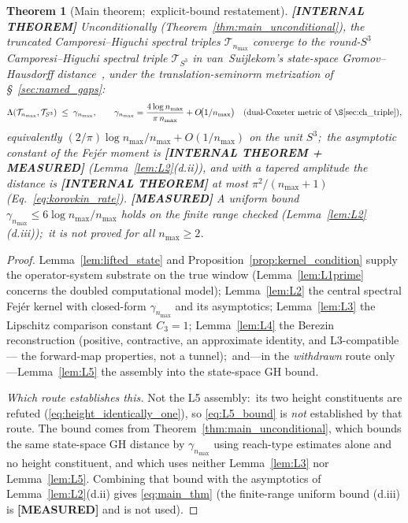 \documentclass[11pt,a4paper]{article}
\theoremstyle{plain}
\newtheorem{theorem}{Theorem}[section]
\theoremstyle{definition}
\newcommand{\nmax}{n_{\max}}
\newcommand{\sthree}{S^{3}}
\newcommand{\Tcal}{\mathcal{T}}
\begin{document}
\begin{theorem}[Main theorem;\ explicit-bound restatement]
\label{thm:main}
\textbf{[INTERNAL THEOREM]}
Unconditionally (Theorem~\ref{thm:main_unconditional}), the
truncated Camporesi--Higuchi spectral triples $\Tcal_{\nmax}$
converge to the round-$\sthree$ Camporesi--Higuchi spectral triple
$\Tcal_{\sthree}$ in van~Suijlekom's state-space Gromov--Hausdorff
distance~\cite{vs2021_jgp}, under the translation-seminorm
metrization of \S~\ref{sec:named_gaps}:
\begin{equation}\label{eq:main_thm}
   \Lambda(\Tcal_{\nmax}, \Tcal_{\sthree})
   \;\le\; \gamma_{\nmax}, \qquad
   \gamma_{\nmax} = \frac{4 \log \nmax}{\pi\,\nmax}
   + O\!\bigl(1/\nmax\bigr)
   \quad\text{(dual-Coxeter metric of \S\ref{sec:ch_triple})},
\end{equation}
equivalently $(2/\pi)\log\nmax/\nmax + O(1/\nmax)$ on the unit
$\sthree$;\ the asymptotic constant of the Fej\'er moment is
\textbf{[INTERNAL THEOREM + MEASURED]} (Lemma~\ref{lem:L2}(d.ii)), and
with a tapered amplitude the distance is \textbf{[INTERNAL THEOREM]}
at most $\pi^2/(\nmax+1)$ (Eq.~\eqref{eq:korovkin_rate}). \textbf{[MEASURED]} A uniform bound
$\gamma_{\nmax} \le 6 \log \nmax / \nmax$
holds on the finite range checked (Lemma~\ref{lem:L2}(d.iii));\ it is not
proved for all $\nmax \ge 2$.
\end{theorem}

\begin{proof}
Lemma~\ref{lem:lifted_state} and Proposition~\ref{prop:kernel_condition}
supply the operator-system substrate on the true window
(Lemma~\ref{lem:L1prime} concerns the doubled computational model);
Lemma~\ref{lem:L2} the central spectral Fej\'er kernel with closed-form
$\gamma_{\nmax}$ and its asymptotics; Lemma~\ref{lem:L3} the Lipschitz
comparison constant $C_3 = 1$; Lemma~\ref{lem:L4} the Berezin
reconstruction (positive, contractive, an approximate identity, and
L3-compatible --- the forward-map properties, not a tunnel);\ and---in the \emph{withdrawn} route only---Lemma~\ref{lem:L5} the assembly into the
state-space GH bound.

\emph{Which route establishes this.}  Not the L5 assembly:\ its two height
constituents are refuted (\eqref{eq:height_identically_one}), so
\eqref{eq:L5_bound} is \emph{not} established by that route.  The bound comes from
Theorem~\ref{thm:main_unconditional}, which bounds the same state-space GH
distance by $\gamma_{\nmax}$ using reach-type estimates alone and no height
constituent, and which uses neither Lemma~\ref{lem:L3} nor
Lemma~\ref{lem:L5}.  Combining that bound with the asymptotics of
Lemma~\ref{lem:L2}(d.ii) gives \eqref{eq:main_thm} (the finite-range
uniform bound (d.iii) is \textbf{[MEASURED]} and is not used).
\end{proof}
\end{document}
